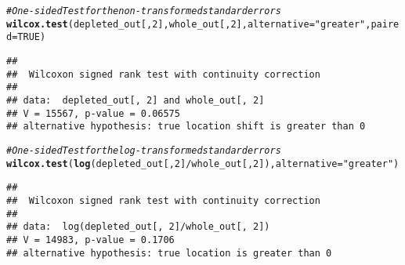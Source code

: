 \documentclass{article}\usepackage[]{graphicx}\usepackage[]{color}
\makeatletter
\newcommand{\hlnum}[1]{\textcolor[rgb]{0.686,0.059,0.569}{#1}}%
\newcommand{\hlstr}[1]{\textcolor[rgb]{0.192,0.494,0.8}{#1}}%
\newcommand{\hlcom}[1]{\textcolor[rgb]{0.678,0.584,0.686}{\textit{#1}}}%
\newcommand{\hlopt}[1]{\textcolor[rgb]{0,0,0}{#1}}%
\newcommand{\hlstd}[1]{\textcolor[rgb]{0.345,0.345,0.345}{#1}}%
\newcommand{\hlkwc}[1]{\textcolor[rgb]{0.333,0.667,0.333}{#1}}%
\newcommand{\hlkwd}[1]{\textcolor[rgb]{0.737,0.353,0.396}{\textbf{#1}}}%
\newenvironment{kframe}{%
 \def\at@end@of@kframe{}%
 \ifinner\ifhmode%
  \def\at@end@of@kframe{\end{minipage}}%
  \begin{minipage}{\columnwidth}%
 \fi\fi%
 \def\FrameCommand##1{\hskip\@totalleftmargin \hskip-\fboxsep
 \colorbox{shadecolor}{##1}\hskip-\fboxsep
     \hskip-\linewidth \hskip-\@totalleftmargin \hskip\columnwidth}%
 \MakeFramed {\advance\hsize-\width
   \@totalleftmargin\z@ \linewidth\hsize
   \@setminipage}}%
 {\par\unskip\endMakeFramed%
 \at@end@of@kframe}
\newenvironment{knitrout}{}{} %
\makeatother
\begin{document}
 
\begin{knitrout}
\color{fgcolor}\begin{kframe}
\begin{alltt}
\hlcom{# One-sided Test for the non-transformed standard errors}
\hlkwd{wilcox.test}\hlstd{(depleted_out[,} \hlnum{2}\hlstd{], whole_out[,} \hlnum{2}\hlstd{],} \hlkwc{alternative} \hlstd{=} \hlstr{"greater"}\hlstd{,} \hlkwc{paired} \hlstd{=} \hlnum{TRUE}\hlstd{)}
\end{alltt}
\begin{verbatim}
## 
## 	Wilcoxon signed rank test with continuity correction
## 
## data:  depleted_out[, 2] and whole_out[, 2]
## V = 15567, p-value = 0.06575
## alternative hypothesis: true location shift is greater than 0
\end{verbatim}
\begin{alltt}
\hlcom{# One-sided Test for the log-transformed standard errors}
\hlkwd{wilcox.test}\hlstd{(}\hlkwd{log}\hlstd{(depleted_out[,} \hlnum{2}\hlstd{]}\hlopt{/}\hlstd{whole_out[,} \hlnum{2}\hlstd{]),} \hlkwc{alternative} \hlstd{=} \hlstr{"greater"}\hlstd{)}
\end{alltt}
\begin{verbatim}
## 
## 	Wilcoxon signed rank test with continuity correction
## 
## data:  log(depleted_out[, 2]/whole_out[, 2])
## V = 14983, p-value = 0.1706
## alternative hypothesis: true location is greater than 0
\end{verbatim}
\end{kframe}
\end{knitrout}
\end{document}
